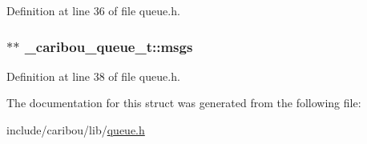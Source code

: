 Definition at line 36 of file queue.\-h.

\hypertarget{struct__caribou__queue__t_ab8bca88f308064d85e3984e7309a60a3}{
\subsubsection[{msgs}]{$\ast$$\ast$ \-\_\-caribou\-\_\-queue\-\_\-t\-::msgs}}\label{struct__caribou__queue__t_ab8bca88f308064d85e3984e7309a60a3}


Definition at line 38 of file queue.\-h.



The documentation for this struct was generated from the following file\-:\begin{DoxyCompactItemize}
\item 
include/caribou/lib/\hyperlink{queue_8h}{queue.\-h}\end{DoxyCompactItemize}
